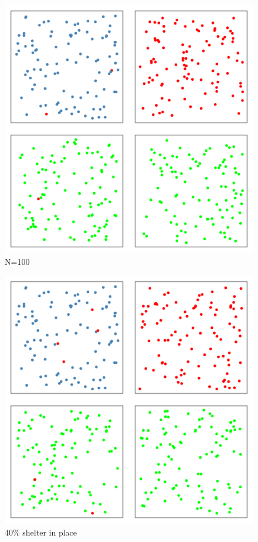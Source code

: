 \documentclass{article}\usepackage[]{graphicx}\usepackage[]{color}
\begin{document}
\begin{figure}
\includegraphics[width=1\textwidth]{SSModel2.png}
\caption{N=100}
\end{figure}

\begin{figure}
\includegraphics[width=1\textwidth]{SSModel3.png}
\caption{40\% shelter in place}
\end{figure}
\end{document}
